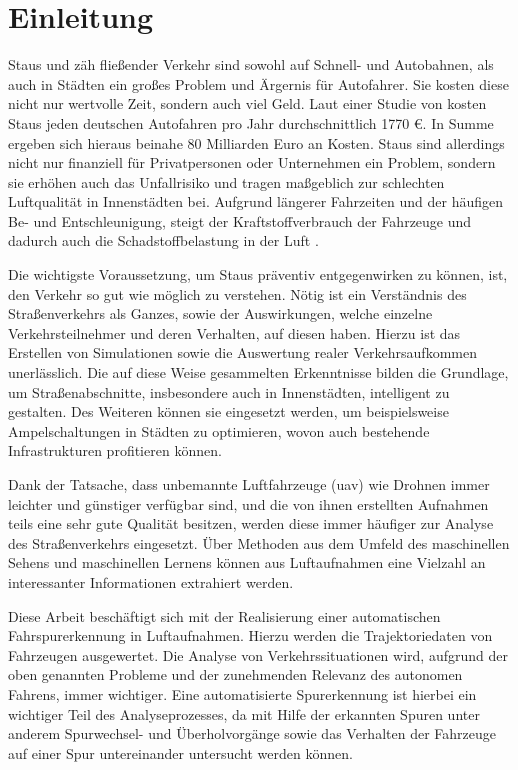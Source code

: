 
\chapter{Einleitung}
\label{cha:introduction}

Staus und zäh fließender Verkehr sind sowohl auf Schnell- und Autobahnen, als auch in Städten ein großes
Problem und Ärgernis für Autofahrer. Sie kosten diese nicht nur wertvolle Zeit, sondern auch viel Geld.
Laut einer Studie von \cite[]{Cookson} kosten Staus jeden deutschen Autofahren pro Jahr durchschnittlich 1770 €.
In Summe ergeben sich hieraus beinahe 80 Milliarden Euro an Kosten.
Staus sind allerdings nicht nur finanziell für Privatpersonen oder Unternehmen ein Problem,
sondern sie erhöhen auch das Unfallrisiko und tragen maßgeblich zur schlechten Luftqualität in Innenstädten bei.
Aufgrund längerer Fahrzeiten und der häufigen Be- und Entschleunigung, steigt der Kraftstoffverbrauch der
Fahrzeuge und dadurch auch die Schadstoffbelastung in der Luft \cite[]{Hemmerle2016}.

Die wichtigste Voraussetzung, um Staus präventiv entgegenwirken zu können, ist, den Verkehr so gut wie
möglich zu verstehen. Nötig ist ein Verständnis des Straßenverkehrs als Ganzes, sowie der Auswirkungen,
welche einzelne Verkehrsteilnehmer und deren Verhalten, auf diesen haben. Hierzu ist das Erstellen von
Simulationen sowie die Auswertung realer Verkehrsaufkommen unerlässlich.
Die auf diese Weise gesammelten Erkenntnisse bilden die Grundlage, um Straßenabschnitte, insbesondere
auch in Innenstädten, intelligent zu gestalten.
Des Weiteren können sie eingesetzt werden, um beispielsweise Ampelschaltungen in Städten zu optimieren,
wovon auch bestehende Infrastrukturen profitieren können.

Dank der Tatsache, dass unbemannte Luftfahrzeuge (\acrshort*{uav}) wie Drohnen immer leichter und günstiger
verfügbar sind, und die von ihnen erstellten Aufnahmen teils eine sehr gute Qualität besitzen, werden
diese immer häufiger zur Analyse des Straßenverkehrs eingesetzt. Über Methoden aus dem Umfeld des
maschinellen Sehens und maschinellen Lernens können aus Luftaufnahmen eine Vielzahl an interessanter
Informationen extrahiert werden.

Diese Arbeit beschäftigt sich mit der Realisierung einer automatischen Fahrspurerkennung in Luftaufnahmen.
Hierzu werden die Trajektoriedaten von Fahrzeugen ausgewertet.
Die Analyse von Verkehrssituationen wird, aufgrund der oben genannten Probleme und der zunehmenden Relevanz
des autonomen Fahrens, immer wichtiger.
Eine automatisierte Spurerkennung ist hierbei ein wichtiger Teil des Analyseprozesses, da mit Hilfe der
erkannten Spuren unter anderem Spurwechsel- und Überholvorgänge sowie das Verhalten der Fahrzeuge
auf einer Spur untereinander untersucht werden können.

